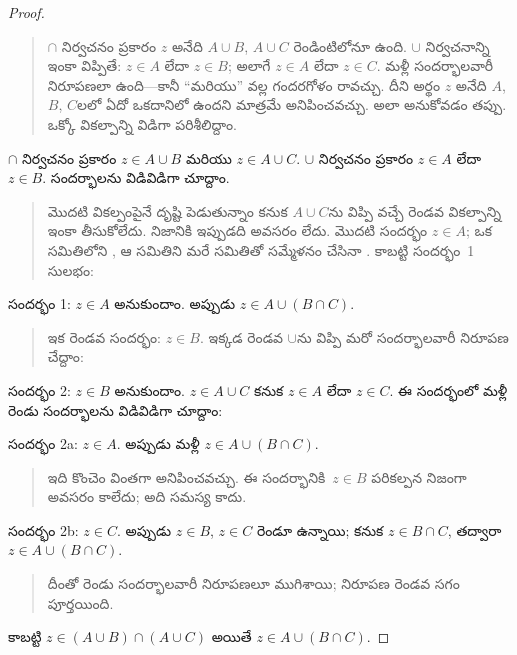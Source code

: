 \documentclass[../../../include/open-logic-section]{subfiles}
\begin{document}
\begin{proof}
\begin{quote}
$\cap$ నిర్వచనం ప్రకారం $z$ అనేది $A \cup B$, $A \cup C$ రెండింటిలోనూ ఉంది. $\cup$ నిర్వచనాన్ని ఇంకా విప్పితే: $z \in A$ లేదా $z \in B$; అలాగే $z \in A$ లేదా $z \in
C$. మళ్లీ సందర్భాలవారీ నిరూపణలా ఉంది---కానీ ``మరియు'' వల్ల గందరగోళం రావచ్చు. దీని అర్థం $z$ అనేది $A$, $B$, $C$లలో ఏదో ఒకదానిలో ఉందని మాత్రమే అనిపించవచ్చు. అలా అనుకోవడం తప్పు. ఒక్కో వికల్పాన్ని విడిగా పరిశీలిద్దాం.
\end{quote}
$\cap$ నిర్వచనం ప్రకారం $z \in A \cup B$ మరియు $z \in A \cup C$. $\cup$ నిర్వచనం ప్రకారం $z \in A$ లేదా $z \in B$. సందర్భాలను విడివిడిగా చూద్దాం.
\begin{quote}
మొదటి వికల్పంపైనే దృష్టి పెడుతున్నాం కనుక $A \cup C$ను విప్పి వచ్చే రెండవ వికల్పాన్ని ఇంకా తీసుకోలేదు. నిజానికి ఇప్పుడది అవసరం లేదు. మొదటి సందర్భం $z \in A$; ఒక సమితిలోని , ఆ సమితిని మరే సమితితో సమ్మేళనం చేసినా . కాబట్టి సందర్భం~1 సులభం:
\end{quote}
సందర్భం 1: $z \in A$ అనుకుందాం. అప్పుడు $z \in A \cup (B \cap
C)$.
\begin{quote}
ఇక రెండవ సందర్భం: $z \in B$. ఇక్కడ రెండవ $\cup$ను విప్పి మరో సందర్భాలవారీ నిరూపణ చేద్దాం:
\end{quote}
సందర్భం 2: $z \in B$ అనుకుందాం. $z \in A \cup C$ కనుక $z \in
A$ లేదా $z \in C$. ఈ సందర్భంలో మళ్లీ రెండు సందర్భాలను విడివిడిగా చూద్దాం:

సందర్భం 2a: $z \in A$. అప్పుడు మళ్లీ $z \in A \cup (B \cap C)$.
\begin{quote}
ఇది కొంచెం వింతగా అనిపించవచ్చు. ఈ సందర్భానికి~$z \in B$ పరికల్పన నిజంగా అవసరం కాలేదు; అది సమస్య కాదు.
\end{quote}
సందర్భం 2b: $z \in C$. అప్పుడు $z \in B$, $z \in C$ రెండూ ఉన్నాయి; కనుక $z \in B \cap C$, తద్వారా $z \in A \cup (B \cap C)$.
\begin{quote}
దీంతో రెండు సందర్భాలవారీ నిరూపణలూ ముగిశాయి; నిరూపణ రెండవ సగం పూర్తయింది.
\end{quote}
కాబట్టి $z \in (A \cup B) \cap (A \cup C)$ అయితే $z \in A \cup (B \cap C)$.
\end{proof}
\end{document}
